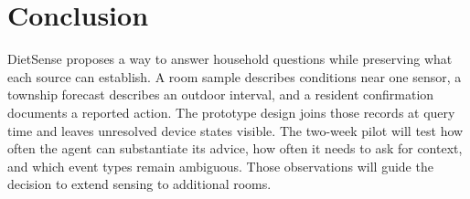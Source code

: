 \section{Conclusion}\label{sec:conclusion}
DietSense proposes a way to answer household questions while preserving what each source can establish. A room sample describes conditions near one sensor, a township forecast describes an outdoor interval, and a resident confirmation documents a reported action. The prototype design joins those records at query time and leaves unresolved device states visible. The two-week pilot will test how often the agent can substantiate its advice, how often it needs to ask for context, and which event types remain ambiguous. Those observations will guide the decision to extend sensing to additional rooms.
